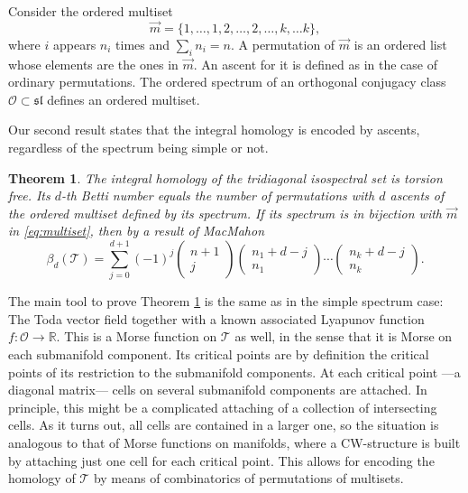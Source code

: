 \documentclass[reqno]{amsart}
\renewcommand{\sl}{\mathfrak{sl}}
\newcommand{\cO}{\mathcal{O}}
\newcommand{\cT}{\mathcal{T}}
\newcommand{\R}{\mathbb{R}}
\newtheorem{theorem}{Theorem}[section]
\begin{document}
Consider  the ordered multiset
\begin{equation}\label{eq:multiset}\overrightarrow{m}=\{1,\dots,1,2,\dots,2,\dots,k,\dots k\},
 \end{equation}
 where $i$ appears $n_i$ times and $\sum_i n_i=n$. A permutation of ${\overrightarrow{m}}$ is an ordered list whose elements are the ones in $\overrightarrow{m}$. An ascent for it is defined as in the case of ordinary permutations. The ordered spectrum of an orthogonal conjugacy class $\cO\subset \sl$ defines an ordered multiset.

 Our second result states that the integral homology is encoded by ascents, regardless of the spectrum being simple or not.

\begin{theorem}\label{thm:betti} The integral homology of the tridiagonal isospectral set  is torsion free. Its $d$-th Betti number equals the number of permutations with $d$ ascents of the ordered multiset defined by its spectrum. If its spectrum is in bijection with $\overrightarrow{m}$ in \eqref{eq:multiset}, then by a result of MacMahon \cite{MM}
 \[\beta_d(\cT)=\sum_{j=0}^{d+1} (-1)^j\begin{pmatrix}n+1\\j\end{pmatrix}\begin{pmatrix}n_1+d-j\\n_1\end{pmatrix}\cdots \begin{pmatrix}n_k+d-j\\n_k\end{pmatrix}.\]
\end{theorem}

The main tool to prove Theorem \ref{thm:betti} is the same as in the simple spectrum case: The Toda vector field together with a  known associated Lyapunov function $f:\cO\to \R$.
This is a Morse function on $\cT$ as well, in the sense that it is Morse on each submanifold component. Its critical points are by definition the critical points of its restriction to the submanifold components. At each critical point ---a diagonal matrix--- cells on several submanifold components are attached. In principle, this might be  a  complicated attaching of a collection of intersecting cells. As it turns out, all cells are contained in a larger one, so the situation is analogous to that of Morse functions on manifolds, where a CW-structure is built by attaching just one cell for each critical point. This allows for encoding the homology of $\cT$  by means of combinatorics of permutations of multisets.
\end{document}
